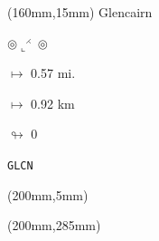 \begin{textblock*}{40mm}(160mm,15mm)%
Glencairn
\par $\circledcirc\llcorner^{\rightthreetimes}\circledcirc$
\Large
\par$\mapsto$ 0.57 mi.
\par$\mapsto$ 0.92 km
\par$\looparrowright$ 0
\par\hfill\tiny\tt GLCN\\
\end{textblock*}
\begin{textblock*}{20mm}(200mm,5mm)%
\fbox{\thepage}
\end{textblock*}
\begin{textblock*}{20mm}(200mm,285mm)%
\fbox{\thepage}
\end{textblock*}
\null\newpage

